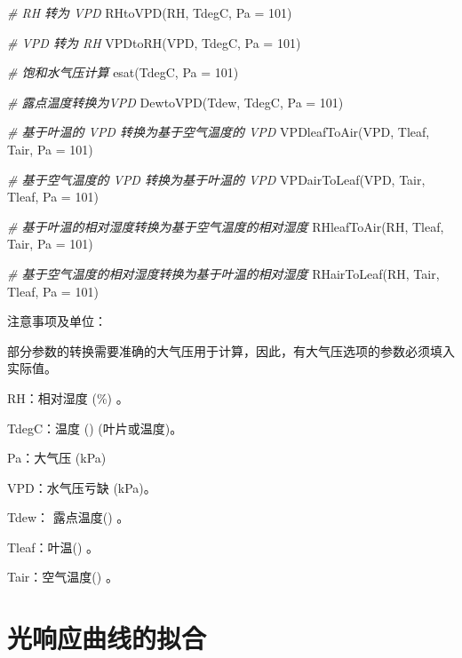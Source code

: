 \documentclass[
]{krantz}
\makeatletter
\newenvironment{Shaded}{\begin{snugshade}}{\end{snugshade}}
\newcommand{\AttributeTok}[1]{\textcolor[rgb]{0.77,0.63,0.00}{#1}}
\newcommand{\CommentTok}[1]{\textcolor[rgb]{0.56,0.35,0.01}{\textit{#1}}}
\newcommand{\DecValTok}[1]{\textcolor[rgb]{0.00,0.00,0.81}{#1}}
\newcommand{\FunctionTok}[1]{\textcolor[rgb]{0.00,0.00,0.00}{#1}}
\newcommand{\NormalTok}[1]{#1}
\newenvironment{kframe}{%
\medskip{}
\setlength{\fboxsep}{.8em}
 \def\at@end@of@kframe{}%
 \ifinner\ifhmode%
  \def\at@end@of@kframe{\end{minipage}}%
  \begin{minipage}{\columnwidth}%
 \fi\fi%
 \def\FrameCommand##1{\hskip\@totalleftmargin \hskip-\fboxsep
 \colorbox{shadecolor}{##1}\hskip-\fboxsep
     \hskip-\linewidth \hskip-\@totalleftmargin \hskip\columnwidth}%
 \MakeFramed {\advance\hsize-\width
   \@totalleftmargin\z@ \linewidth\hsize
   \@setminipage}}%
 {\par\unskip\endMakeFramed%
 \at@end@of@kframe}
\renewenvironment{Shaded}{\begin{kframe}}{\end{kframe}}
\makeatother
\begin{document}
\begin{Shaded}
\begin{Highlighting}[]
\CommentTok{\# RH 转为 VPD  }
\FunctionTok{RHtoVPD}\NormalTok{(RH, TdegC, }\AttributeTok{Pa =} \DecValTok{101}\NormalTok{) }
 
\CommentTok{\# VPD 转为 RH   }
\FunctionTok{VPDtoRH}\NormalTok{(VPD, TdegC, }\AttributeTok{Pa =} \DecValTok{101}\NormalTok{) }
 
\CommentTok{\#  饱和水气压计算 }
\FunctionTok{esat}\NormalTok{(TdegC, }\AttributeTok{Pa =} \DecValTok{101}\NormalTok{) }
 
\CommentTok{\#  露点温度转换为VPD }
\FunctionTok{DewtoVPD}\NormalTok{(Tdew, TdegC, }\AttributeTok{Pa =} \DecValTok{101}\NormalTok{) }
 
\CommentTok{\#  基于叶温的 VPD 转换为基于空气温度的 VPD}
\FunctionTok{VPDleafToAir}\NormalTok{(VPD, Tleaf, Tair, }\AttributeTok{Pa =} \DecValTok{101}\NormalTok{) }
 
\CommentTok{\#  基于空气温度的 VPD 转换为基于叶温的 VPD }
\FunctionTok{VPDairToLeaf}\NormalTok{(VPD, Tair, Tleaf, }\AttributeTok{Pa =} \DecValTok{101}\NormalTok{) }
 
\CommentTok{\#  基于叶温的相对湿度转换为基于空气温度的相对湿度  }
\FunctionTok{RHleafToAir}\NormalTok{(RH, Tleaf, Tair, }\AttributeTok{Pa =} \DecValTok{101}\NormalTok{) }
 
\CommentTok{\#  基于空气温度的相对湿度转换为基于叶温的相对湿度  }
\FunctionTok{RHairToLeaf}\NormalTok{(RH, Tair, Tleaf, }\AttributeTok{Pa =} \DecValTok{101}\NormalTok{) }
\end{Highlighting}
\end{Shaded}

注意事项及单位：

部分参数的转换需要准确的大气压用于计算，因此，有大气压选项的参数必须填入实际值。

RH：相对湿度 (\%) 。

TdegC：温度 (\textcelsius) (叶片或温度)。

Pa：大气压 (kPa)

VPD：水气压亏缺 (kPa)。

Tdew： 露点温度(\textcelsius) 。

Tleaf：叶温(\textcelsius) 。

Tair：空气温度(\textcelsius) 。

\cleardoublepage

\hypertarget{lrc_fit}{%
\chapter{光响应曲线的拟合}\label{lrc_fit}}
\end{document}

